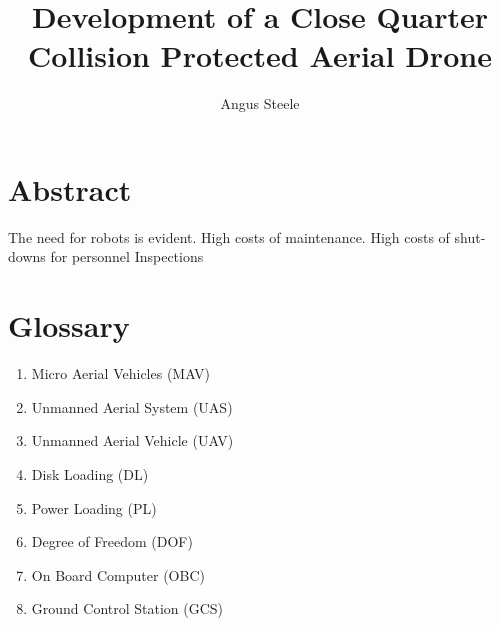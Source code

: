 \documentclass[12pt]{report}
\title{Development of a Close Quarter Collision Protected Aerial Drone}
\author{Angus Steele}
\begin{document}
\maketitle


\chapter*{Abstract}
The need for robots is evident. High costs of maintenance. High costs of shut-downs for personnel Inspections


\tableofcontents
\listoftables


\chapter*{Glossary}
\begin{enumerate}
\item Micro Aerial Vehicles (MAV)
\item Unmanned Aerial System (UAS)
\item Unmanned Aerial Vehicle (UAV)
\item Disk Loading (DL)
\item Power Loading (PL)
\item Degree of Freedom (DOF)

\item On Board Computer (OBC)
\item Ground Control Station (GCS)
\end{enumerate}

\newpage
\end{document}
